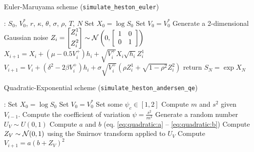         \begin{algorithm}[htbp]
            \caption{Euler-Maruyama scheme (\texttt{simulate\_heston\_euler})}
            \label{alg:euler}
            \begin{algorithmic}
                : $S_0$, $V_0^*$, $r$, $\kappa$, $\theta$, $\sigma$, $\rho$, $T$, $N$
                \State Set $X_0 = \log S_0$
                \State Set $V_0 = V_0^*$
                \State Generate a 2-dimensional Gaussian noise $Z_i = \left[\begin{aligned}
                    Z_i^1\\
                    Z_i^2               
                \end{aligned}\right] \sim {\cal N}\left(0,\left[\begin{array}{cc}
                    1 & 0\\
                    0 & 1
                \end{array}\right]\right)$
                    \State $X_{i+1}  = X_i + (\mu - 0.5 V_i^+)h_i + \sqrt{V_i^+} X_i \sqrt{h_i} Z_i^1$
                    \State $ V_{i+1}  = V_i + \left(\delta^2 - 2\beta V_i^+\right) h_i + \sigma \sqrt{V_i^+} \left(\rho Z_i^1 + \sqrt{1-\rho^2}Z_i^2\right)$
                \EndFor
                \State return $S_N = \exp X_N$
            \end{algorithmic}
        \end{algorithm}

        \begin{algorithm}[htbp]
            \caption{Quadratic-Exponential scheme (\texttt{simulate\_heston\_andersen\_qe})}
            \label{alg:andersen_qe}
            \begin{algorithmic}
                : 
                \State Set $X_0 = \log S_0$
                \State Set $V_0 = V_0^*$
                \State Set some $\psi_c \in [1, 2]$
                    \State Compute $m$ and $s^2$ given $V_{i-1}$.
                    \State Compute the coefficient of variation $\psi = \frac{s^2}{m^2}$
                    \State Generate a random number $U_V \sim U(0,1)$
                        \State Compute $a$ and $b$ (eq. \eqref{eq:quadratic:a} -- \eqref{eq:quadratic:b})
                        \State Compute $Z_V \sim {\cal N}(0,1)$ using the Smirnov transform applied to $U_V$
                        \State Compute $V_{i+1} = a\left(b+Z_V\right)^2$
                    \Else
                        \State
                    \EndIf
                \EndFor
            \end{algorithmic}
        \end{algorithm}


